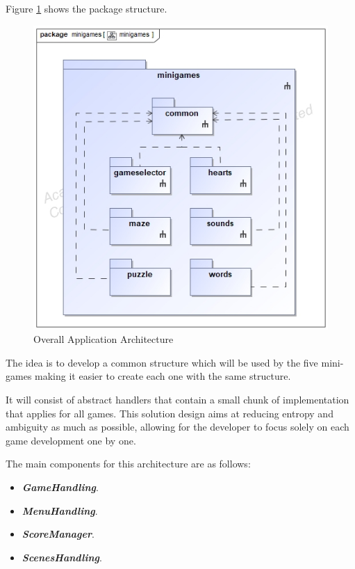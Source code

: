\newpage
Figure \ref{fig:packages} shows the package structure.

\begin{figure}[H]
    \centering
    \includegraphics[scale=.5]{Chapters/arq/class__minigames__minigames.jpg}
    \caption{Overall Application Architecture}
    \label{fig:packages}
\end{figure}

The idea is to develop a common structure which will be used by the five mini-games making it easier to create each one with the same structure. 

It will consist of abstract handlers that contain a small chunk of implementation that applies for all games. This solution design aims at reducing entropy and ambiguity as much as possible, allowing for the developer to focus solely on each game development one by one.

The main components for this architecture are as follows:
\begin{itemize}
    \item \textbf{\textit{GameHandling}}.
    \item  \textbf{\textit{MenuHandling}}.
    \item \textbf{\textit{ScoreManager}}.
    \item \textbf{\textit{ScenesHandling}}.
\end{itemize}

